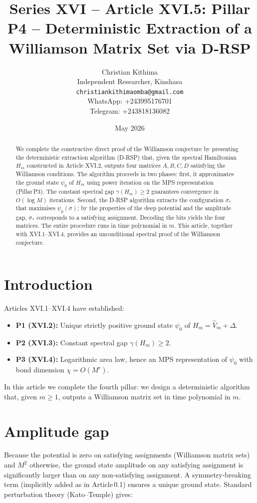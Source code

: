 \documentclass[11pt,a4paper]{article}
\title{Series XVI – Article XVI.5: Pillar P4 – Deterministic Extraction of a Williamson Matrix Set via D‑RSP}
\author{Christian Kithima \\
Independent Researcher, Kinshasa \\
\texttt{christiankithimaomba@gmail.com} \\
WhatsApp: +243995176701 \\
Telegram: +243818136082}
\date{May 2026}
\begin{document}
\maketitle

\begin{abstract}
We complete the constructive direct proof of the Williamson conjecture by presenting the deterministic extraction algorithm (D‑RSP) that, given the spectral Hamiltonian $H_m$ constructed in Article XVI.2, outputs four matrices $A,B,C,D$ satisfying the Williamson conditions. The algorithm proceeds in two phases: first, it approximates the ground state $\psi_0$ of $H_m$ using power iteration on the MPS representation (Pillar P3). The constant spectral gap $\gamma(H_m)\ge 2$ guarantees convergence in $O(\log M)$ iterations. Second, the D‑RSP algorithm extracts the configuration $\sigma_*$ that maximises $\psi_0(\sigma)$; by the properties of the deep potential and the amplitude gap, $\sigma_*$ corresponds to a satisfying assignment. Decoding the bits yields the four matrices. The entire procedure runs in time polynomial in $m$. This article, together with XVI.1–XVI.4, provides an unconditional spectral proof of the Williamson conjecture.
\end{abstract}

\tableofcontents

\section{Introduction}

Articles XVI.1–XVI.4 have established:
\begin{itemize}
\item \textbf{P1 (XVI.2):} Unique strictly positive ground state $\psi_0$ of $H_m = \hat{V}_m + \Delta$.
\item \textbf{P2 (XVI.3):} Constant spectral gap $\gamma(H_m) \ge 2$.
\item \textbf{P3 (XVI.4):} Logarithmic area law, hence an MPS representation of $\psi_0$ with bond dimension $\chi = O(M^c)$.
\end{itemize}
In this article we complete the fourth pillar: we design a deterministic algorithm that, given $m\ge 1$, outputs a Williamson matrix set in time polynomial in $m$.

\section{Amplitude gap}

Because the potential is zero on satisfying assignments (Williamson matrix sets) and $M^2$ otherwise, the ground state amplitude on any satisfying assignment is significantly larger than on any non‑satisfying assignment. A symmetry‑breaking term (implicitly added as in Article 0.1) ensures a unique ground state. Standard perturbation theory (Kato–Temple) gives:
\end{document}
